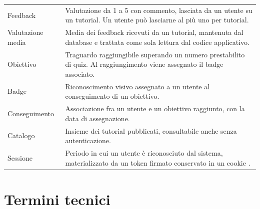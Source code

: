 \begin{longtable}{@{}L{3.2cm} L{11.5cm}@{}}
Feedback &
Valutazione da 1 a 5 con commento, lasciata da un utente su un tutorial.
Un utente può lasciarne al più uno per tutorial. \\

Valutazione media &
Media dei feedback ricevuti da un tutorial, mantenuta dal database e
trattata come sola lettura dal codice applicativo. \\

Obiettivo &
Traguardo raggiungibile superando un numero prestabilito di quiz. Al
raggiungimento viene assegnato il badge associato. \\

Badge &
Riconoscimento visivo assegnato a un utente al conseguimento di un
obiettivo. \\

Conseguimento &
Associazione fra un utente e un obiettivo raggiunto, con la data di
assegnazione. \\

Catalogo &
Insieme dei tutorial pubblicati, consultabile anche senza autenticazione. \\

Sessione &
Periodo in cui un utente è riconosciuto dal sistema, materializzato da un
token firmato conservato in un cookie . \\

\end{longtable}

\section{Termini tecnici}

